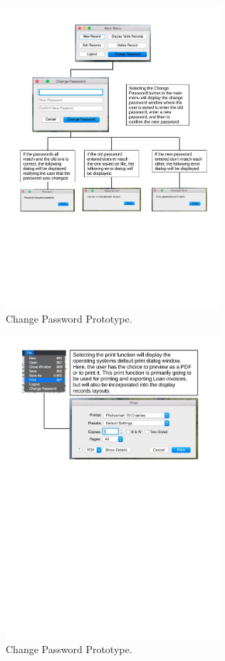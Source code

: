 \begin{figure}[H]
    \centerline{\includegraphics[width=300px]{./Design/Prototyping/Change_password_prototyping.pdf}}
    \caption{Change Password Prototype.} \label{fig:relationship_diagram}
\end{figure}

\begin{figure}[H]
    \centerline{\includegraphics[width=300px]{./Design/Prototyping/Printing_prototyping.pdf}}
    \caption{Change Password Prototype.} \label{fig:relationship_diagram}
\end{figure}

